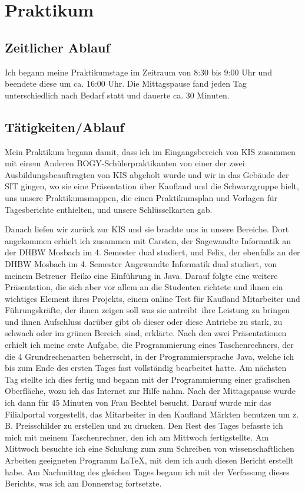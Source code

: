 \chapter{Praktikum}

\section{Zeitlicher Ablauf}

Ich begann meine Praktikumstage im Zeitraum von 8:30 bis 9:00 Uhr und beendete diese um ca. 16:00 Uhr. Die Mittagspause fand jeden Tag unterschiedlich nach Bedarf statt und dauerte ca. 30 Minuten. 

\section{Tätigkeiten/Ablauf}

Mein Praktikum begann damit, dass ich im Eingangsbereich von KIS zusammen mit einem Anderen BOGY-Schülerpraktikanten von einer der zwei Ausbildungsbeauftragten von KIS abgeholt wurde und wir in das Gebäude der SIT gingen, wo sie eine Präsentation über Kaufland und die Schwarzgruppe hielt, uns unsere Praktikumsmappen, die einen Praktikumsplan und Vorlagen für Tagesberichte enthielten, und unsere Schlüsselkarten gab.

Danach liefen wir zurück zur KIS und sie brachte uns in unsere Bereiche. Dort angekommen erhielt ich zusammen mit Carsten, der Sngewandte Informatik an der DHBW Mosbach im 4. Semester dual studiert, und Felix, der ebenfalls an der DHBW Mosbach im 4. Semester Angewandte Informatik dual studiert, von meinem \frqq Betreuer\flqq \ Heiko eine Einführung in Java. Darauf folgte eine weitere Präsentation, die sich aber vor allem an die Studenten richtete und ihnen ein wichtiges Element ihres Projekts, einem online Test für Kaufland Mitarbeiter und Führungskräfte, der ihnen zeigen soll was sie \frqq antreibt\flqq \ ihre Leistung zu bringen und ihnen Aufschluss darüber gibt ob dieser oder diese Antriebe zu stark, zu schwach oder im \frqq grünen Bereich\flqq \ sind, erklärte. Nach den zwei Präsentationen erhielt ich meine erste Aufgabe, die Programmierung eines Taschenrechners, der die 4 Grundrechenarten beherrscht, in der Programmiersprache Java, welche ich bis zum Ende des ersten Tages fast vollständig bearbeitet hatte. Am nächsten Tag stellte ich dies fertig und begann mit der Programmierung einer grafischen Oberfläche, wozu ich das Internet zur Hilfe nahm. Nach der Mittagspause wurde ich dann für 45 Minuten von Frau Bechtel besucht. Darauf wurde mir das Filialportal vorgestellt, das Mitarbeiter in den Kaufland Märkten benutzen um z. B. Preisschilder zu erstellen und zu drucken. Den Rest des Tages befasste ich mich mit meinem Taschenrechner, den ich am Mittwoch fertigstellte. Am Mittwoch besuchte ich eine Schulung zum zum Schreiben von wissenschaftlichen Arbeiten geeigneten Programm LaTeX, mit dem ich auch diesen Bericht erstellt habe. Am Nachmittag des gleichen Tages begann ich mit der Verfassung dieses Berichts, was ich am Donnerstag fortsetzte. 

